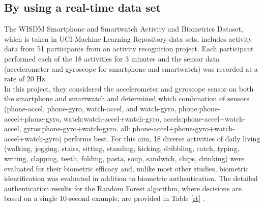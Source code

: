 \documentclass{IJFS}
\begin{document}
\subsection{By using a real-time data set} 
The WISDM Smartphone and Smartwatch Activity and Biometrics Dataset, which is taken in UCI Machine Learning Repository data sets, includes activity data from 51 participants from an activity recognition project. Each participant performed each of the 18 activities for 3 minutes and the sensor data (accelerometer and gyroscope for smartphone and smartwatch) was recorded at a rate of 20 Hz. \\ In this project, they considered the accelerometer and gyroscope sensor on both the smartphone and smartwatch and determined which combination of sensors (phone-accel, phone-gyro, watch-accel, and watch-gyro, phone:phone-accel+phone-gyro, watch:watch-accel+watch-gyro, accels:phone-accel+watch-accel, gyros:phone-gyro+watch-gyro, all: phone-accel+phone-gyro+watch-accel+watch-gyro) performs best. For this aim, 18 diverse activities of daily living (walking, jogging, stairs, sitting, standing, kicking, dribbling, catch, typing, writing, clapping, teeth, folding, pasta, soup, sandwich, chips, drinking) were evaluated for their biometric efficacy and, unlike most other studies, biometric identification was evaluated in addition to biometric authentication. The detailed authentication results for the Random Forest algorithm, where decisions are based on a single 10-second example, are provided in Table \ref{rt} \cite{wes}. 
\end{document}
